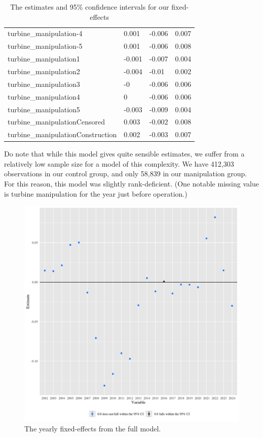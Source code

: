 \documentclass{article}
\begin{document}
\begin{table}[]
\begin{tabular}{llll}
turbine\_manipulation-4           & 0.001             & -0.006         & 0.007           \\
turbine\_manipulation-5           & 0.001             & -0.006         & 0.008           \\
turbine\_manipulation1            & -0.001            & -0.007         & 0.004           \\
turbine\_manipulation2            & -0.004            & -0.01          & 0.002           \\
turbine\_manipulation3            & -0                & -0.006         & 0.006           \\
turbine\_manipulation4            & 0                 & -0.006         & 0.006           \\
turbine\_manipulation5            & -0.003            & -0.009         & 0.004           \\
turbine\_manipulationCensored     & 0.003             & -0.002         & 0.008           \\
turbine\_manipulationConstruction & 0.002             & -0.003         & 0.007          
\end{tabular}
\caption{The estimates and 95\% confidence intervals for our fixed-effects}

\end{table}

Do note that while this model gives quite sensible estimates, we suffer from a relatively low sample size for a model of this complexity.
We have 412,303 observations in our control group, and only 58,839 in our manipulation group.
For this reason, this model was slightly rank-deficient.
(One notable missing value is turbine manipulation for the year just before operation.)

\begin{figure}[h]
\centering
\includegraphics[width=0.9\linewidth]
{fixef_general.png} 
\caption{The yearly fixed-effects from the full model.}
\label{fixef_general}
\end{figure}
\end{document}
